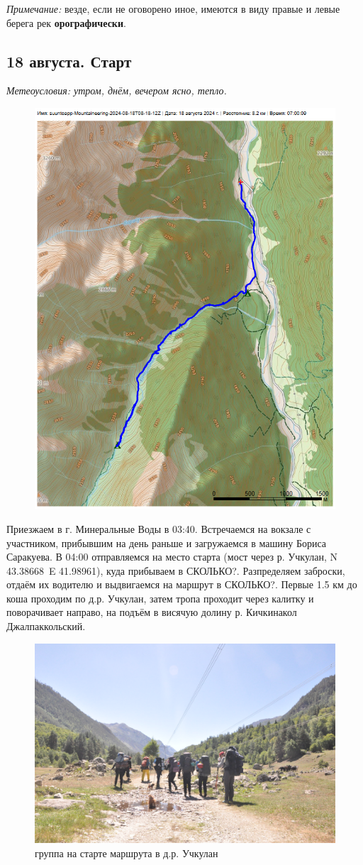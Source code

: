 \textit{Примечание:} везде, если не оговорено иное, имеются в виду правые и левые берега рек \textbf{орографически}.
\subsection{18 августа. Старт}
\textit{Метеоусловия: утром, днём, вечером ясно, тепло.}

\begin{figure}[h!]
	\centering
	\includegraphics[angle=0, width=0.7\linewidth]{../pics/mini_maps/18}
	\label{fig:mini_18}
\end{figure}


Приезжаем в г. Минеральные Воды в 03:40. Встречаемся на вокзале с участником, прибывшим на день раньше и загружаемся в машину Бориса Саракуева. В 04:00 отправляемся на место старта (мост через р. Учкулан, N 43.38668\degree~E 41.98961\degree), куда прибываем в \alert{СКОЛЬКО?}. Разпределяем заброски, отдаём их водителю и выдвигаемся на маршрут в \alert{СКОЛЬКО?}. Первые 1.5 км до коша проходим по д.р. Учкулан, затем тропа проходит через калитку и поворачивает направо, на подъём в висячую долину р. Кичкинакол Джалпаккольский.

\begin{figure}[h!]
	\centering
	\includegraphics[width=0.7\linewidth]{../pics/DSC_0412}
	\caption{группа на старте маршрута в д.р. Учкулан}
	\label{fig:uchkulan}
\end{figure}


